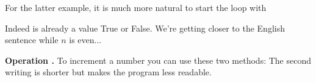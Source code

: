 \documentclass[11pt,class=report,crop=false]{standalone}
\begin{document}
\begin{cours}
\begin{exemple}
For the latter example, it is much more natural to start the loop with

Indeed  is already a value \og{}True\fg{} or \og{}False\fg{}.
We're getting closer to the English sentence \og{}while $n$ is even...\fg{}

\end{exemple}


\textbf{Operation \og{}\ci{+=}\fg{}.}
To increment a number you can use these two methods:
The second writing is shorter but makes the program less readable.
\end{cours}



\end{document}
